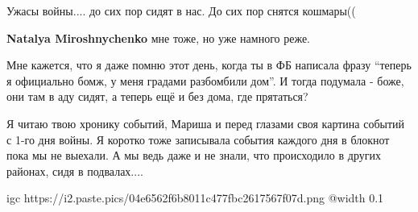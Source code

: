  
 
 
 
 

\qqSecCmt


Ужасы войны.... до сих пор сидят в нас. До сих пор снятся кошмары((

\begin{itemize} %
\textbf{Natalya Miroshnychenko} мне тоже, но уже намного реже.
\end{itemize} %


Мне кажется, что я даже помню этот день, когда ты в ФБ написала фразу \enquote{теперь я
официально бомж, у меня градами разбомбили дом}. И тогда подумала - боже, они
там в аду сидят, а теперь ещё и без дома, где прятаться?


Я читаю твою хронику событий, Мариша и перед глазами своя картина событий с
1-го дня войны. Я коротко тоже записывала события каждого дня в блокнот пока мы
не выехали. А мы ведь даже и не знали, что происходило в других районах, сидя в
подвалах....


\ifcmt
  igc https://i2.paste.pics/04e6562f6b8011c477fbc2617567f07d.png
	@width 0.1
\fi
